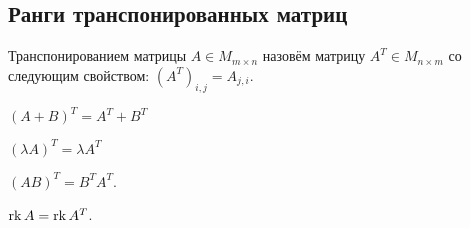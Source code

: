\subsection{Ранги транспонированных матриц}
\begin{definition}
    Транспонированием матрицы $A\in M_{m\times n}$ назовём
    матрицу $A^T\in M_{n\times m}$ со следующим свойством:
    $(A^T)_{i,j} = A_{j,i}$.
\end{definition}
\begin{properties}
    \item $(A + B)^T = A^T + B^T$
    \item $(\lambda A)^T=\lambda A^T$
    \item $(AB)^T = B^TA^T$.
\end{properties}
\begin{theorem}
    $\operatorname{rk} A = \operatorname{rk} A^T$.
\end{theorem}
